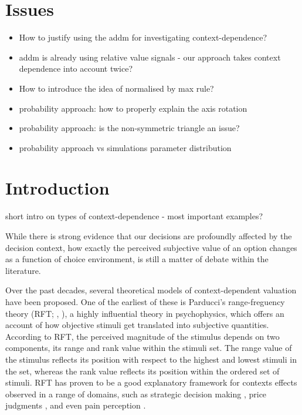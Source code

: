 \documentclass[11pt,a4paper]{article}
\begin{document}
	
	
\section{Issues}


\begin{itemize}
\item How to justify using the addm for investigating context-dependence?
\item addm is already using relative value signals - our approach takes context dependence into account twice?
\item How to introduce the idea of normalised by max rule? 
\item probability approach: how to properly explain the axis rotation
\item probability approach: is the non-symmetric triangle an issue?
\item probability approach vs simulations parameter distribution
\end{itemize}

\newpage

\section{Introduction} \label{chap1intro}

short intro on types of context-dependence - most important examples?

While there is strong evidence that our decisions are profoundly affected by the decision context, how exactly the perceived subjective value of an option changes as a function of choice environment, is still a matter of debate within the literature. 

Over the past decades, several theoretical models of context-dependent valuation have been proposed. One of the earliest of these is Parducci's range-freguency theory (RFT; , ), a highly influential theory in psychophysics, which offers an account of how objective stimuli get translated into subjective quantities. According to RFT, the perceived magnitude of the stimulus depends on two components, its range and rank value within the stimuli set. The range value of the stimulus reflects its position with respect to the highest and lowest stimuli in the set, whereas the rank value reflects its position within the ordered set of stimuli. RFT has proven to be a good explanatory framework for contexts effects observed in a range of domains, such as strategic decision making \cite{Vlaev2006a}, price judgments \cite{Niedrich2009}, and even pain perception \cite{Watkinson2013}.  
\end{document}
